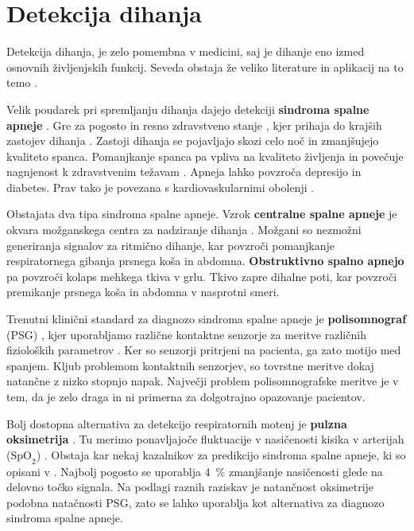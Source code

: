 \section{Detekcija dihanja}\label{sec:detekcija-dihanja}
Detekcija dihanja, je zelo pomembna v medicini, saj je dihanje eno izmed osnovnih življenjskih funkcij. Seveda obstaja že veliko literature in aplikacij na to temo \cite{sathyanarayana2015vision}.

Velik poudarek pri spremljanju dihanja dajejo detekciji  \textbf{sindroma spalne apneje} \cite{sathyanarayana2015vision}. Gre za pogosto in resno zdravstveno stanje \cite{wang2006vision}, kjer prihaja do krajših zastojev dihanja \cite{flemons2002obstructive}. Zastoji dihanja se pojavljajo skozi celo noč in zmanjšujejo kvaliteto spanca. Pomanjkanje spanca pa vpliva na kvaliteto življenja in povečuje nagnjenost k zdravstvenim težavam \cite{malhotra2002obstructive}. Apneja lahko povzroča depresijo in diabetes. Prav tako je povezana s kardiovaskularnimi obolenji \cite{takemura2005respiratory}.

Obstajata dva tipa sindroma spalne apneje. Vzrok \textbf{centralne spalne apneje} je okvara možganskega centra za nadziranje dihanja \cite{javaheri2010central}. Možgani so nezmožni generiranja signalov za ritmično dihanje, kar povzroči pomanjkanje respiratornega gibanja prsnega koša in abdomna. \textbf{Obstruktivno spalno apnejo} pa povzroči kolaps mehkega tkiva v grlu. Tkivo zapre dihalne poti, kar povzroči premikanje prsnega koša in abdomna v nasprotni smeri.

Trenutni klinični standard za diagnozo sindroma spalne apneje je \textbf{polisomnograf} (PSG) \cite{collop2007clinical}, kjer uporabljamo različne kontaktne senzorje za meritve različnih fizioloških parametrov \cite{heinrich2015video}. Ker so senzorji pritrjeni na pacienta, ga zato motijo med spanjem. Kljub problemom kontaktnih senzorjev, so tovrstne meritve dokaj natančne z nizko stopnjo napak. Največji problem polisomnografske meritve je v tem, da je zelo draga in ni primerna za dolgotrajno opazovanje pacientov.

Bolj dostopna alternativa za detekcijo respiratornih motenj je \textbf{pulzna oksimetrija} \cite{netzer2001overnight}. Tu merimo ponavljajoče fluktuacije v nasičenosti kisika v arterijah ($\mathrm{SpO}_{2}$) \cite{levy1996accuracy}. Obstaja kar nekaj kazalnikov za predikcijo sindroma spalne apneje, ki so opisani v \cite{netzer2001overnight, magalang2003prediction}. Najbolj pogosto se uporablja \SI{4}{\%} zmanjšanje nasičenosti glede na delovno točko signala. Na podlagi raznih raziskav \cite{cooper1991value,magalang2003prediction,netzer2001overnight,levy1996accuracy} je natančnost oksimetrije podobna natačnosti PSG, zato se lahko uporablja kot alternativa za diagnozo sindroma spalne apneje.


